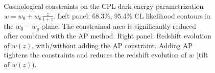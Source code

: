\documentclass[prl,twocolumn,superscriptaddress,aps,amsmath,amssymb,nofootinbib,altaffilletter]{revtex4}
\begin{document}
\begin{figure}
   \caption{\label{fig_con}
   Cosmological constraints on the CPL dark energy parametrization $w=w_0+w_a\frac{z}{1+z}$.
   Left panel: 68.3\%, 95.4\% CL likelihood contours in the  $w_0-w_a$ plane.
   The constrained area is significantly reduced after combined with the AP method.
   Right panel: Redshift evolution of $w(z)$, with/without adding the AP constraint.
   Adding AP tightens the constraints and reduces the redshift evolution of $w$ (tilt of $w(z)$).
   }
\end{figure}


\end{document}
